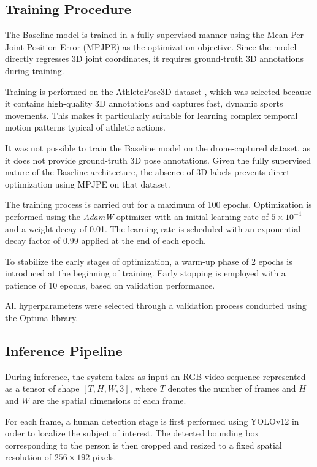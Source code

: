 \subsection{Training Procedure}
The Baseline model is trained in a fully supervised manner using the Mean Per Joint Position Error (MPJPE) as the optimization objective. Since the model directly regresses 3D joint coordinates, it requires ground-truth 3D annotations 
during training.

Training is performed on the AthletePose3D dataset \cite{yeung2025athletepose3d}, which was selected because it contains high-quality 3D annotations and captures fast, dynamic sports movements. This makes it particularly suitable for 
learning complex temporal motion patterns typical of athletic actions. 

It was not possible to train the Baseline model on the drone-captured dataset, as it does not provide ground-truth 3D pose annotations. Given the fully supervised nature of the Baseline architecture, the absence of 3D labels prevents 
direct optimization using MPJPE on that dataset.

The training process is carried out for a maximum of 100 epochs. Optimization is performed using the \textit{AdamW} optimizer with an initial learning rate of $5 \times 10^{-4}$ and a weight decay of 0.01. The learning rate is scheduled with 
an exponential decay factor of 0.99 applied at the end of each epoch.

To stabilize the early stages of optimization, a warm-up phase of 2 epochs is introduced at the beginning of training. Early stopping is employed with a patience of 10 epochs, based on validation performance.

All hyperparameters were selected through a validation process conducted using the \href{https://optuna.org/}{Optuna} library.

\subsection{Inference Pipeline}
\label{sec:inf_baseline}
During inference, the system takes as input an RGB video sequence represented as a tensor of shape $[T, H, W, 3]$, where $T$ denotes the number of frames and $H$ and $W$ are the spatial dimensions of each frame.

For each frame, a human detection stage is first performed using YOLOv12 \cite{tian2025yolov12} in order to localize the subject of interest. The detected bounding box corresponding to the person is then cropped and resized to a 
fixed spatial resolution of $256 \times 192$ pixels.

